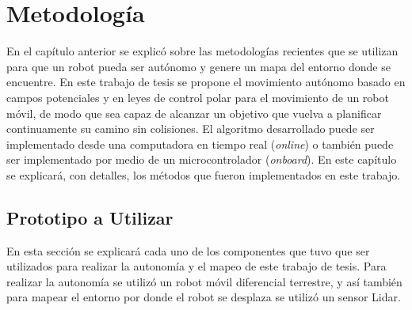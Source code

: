 \chapter{Metodolog\'ia}

En el cap\'itulo anterior se explic\'o sobre las metodolog\'ias recientes que se 
utilizan para que un robot pueda ser aut\'onomo y genere un mapa 
del entorno donde se encuentre. En este trabajo de tesis se propone 
el movimiento aut\'onomo basado en campos potenciales y en leyes de control 
polar para el movimiento de un robot m\'ovil, de modo que sea capaz de alcanzar 
un objetivo que vuelva a planificar continuamente su camino sin colisiones. El 
algoritmo desarrollado puede ser implementado desde una computadora en tiempo 
real (\textit{online}) o tambi\'en puede ser implementado por medio de un 
microcontrolador (\textit{onboard}). En este cap\'itulo se explicar\'a, con detalles, 
los m\'etodos que fueron implementados en este trabajo.

\section{Prototipo a Utilizar}
En esta secci\'on se explicar\'a cada uno de los componentes que tuvo que 
ser utilizados para realizar la autonom\'ia y el mapeo de este trabajo de 
tesis. Para realizar la autonom\'ia se utiliz\'o un robot m\'ovil diferencial 
terrestre, y as\'i tambi\'en para mapear el entorno por donde el robot se 
desplaza se utiliz\'o un sensor Lidar.


